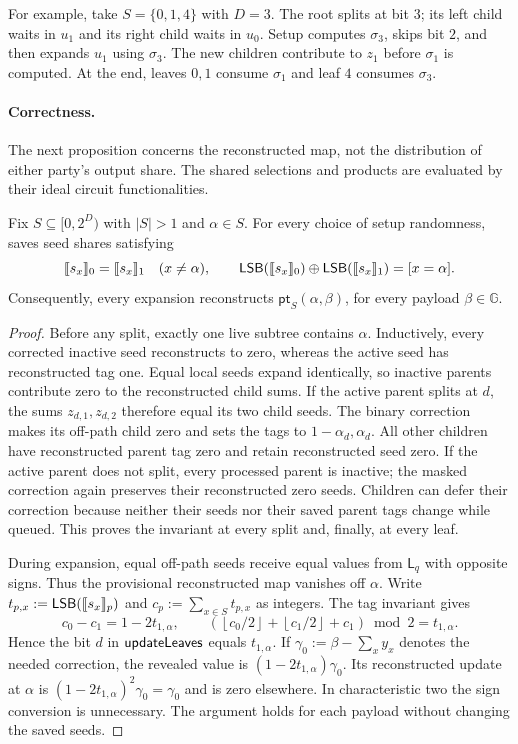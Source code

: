 For example, take $S=\{0,1,4\}$ with $D=3$.
The root splits at bit $3$; its left child waits in $u_1$ and its right child
waits in $u_0$. Setup computes $\sigma_3$, skips bit $2$, and then expands
$u_1$ using $\sigma_3$. The new children contribute to $z_1$ before
$\sigma_1$ is computed. At the end, leaves $0,1$ consume $\sigma_1$ and leaf
$4$ consumes $\sigma_3$.

\paragraph{Correctness.}
The next proposition concerns the reconstructed map, not the distribution
of either party's output share. The shared selections and products are
evaluated by their ideal circuit functionalities.

\begin{proposition}\label{prop:sparse-leaf-invariant}
Fix $S\subseteq[0,2^D)$ with $|S|>1$ and $\alpha\in S$.
For every choice of setup randomness,  saves seed
shares satisfying
\[
 \share{s_x}_0=\share{s_x}_1\quad(x\neq\alpha),
 \qquad
 \lsb(\share{s_x}_0)\oplus\lsb(\share{s_x}_1)=[x=\alpha].
\]
Consequently, every expansion reconstructs
$\mathsf{pt}_S(\alpha,\beta)$, for every payload $\beta\in\mathbb G$.
\end{proposition}
\begin{proof}
Before any split, exactly one live subtree contains $\alpha$.
Inductively, every corrected inactive seed reconstructs to zero, whereas the
active seed has reconstructed tag one. Equal local seeds expand identically,
so inactive parents contribute zero to the reconstructed child sums.
If the active parent splits at $d$, the sums $z_{d,1},z_{d,2}$ therefore
equal its two child seeds.
The binary correction makes its off-path child zero and sets the tags
to $1-\alpha_d,\alpha_d$. All other children have reconstructed parent tag
zero and retain reconstructed seed zero.
If the active parent does not split, every processed parent is inactive;
the masked correction again preserves their reconstructed zero seeds.
Children can defer their correction because neither their seeds nor their
saved parent tags change while queued. This proves the invariant at every
split and, finally, at every leaf.

During expansion, equal off-path seeds receive equal values from
$\mathsf L_q$ with opposite signs. Thus the provisional reconstructed map
vanishes off $\alpha$. Write $t_{p,x}:=\lsb(\share{s_x}_p)$ and
$c_p:=\sum_{x\in S}t_{p,x}$ as integers.
The tag invariant gives
\[
 c_0-c_1=1-2t_{1,\alpha},
 \qquad
 \left(\left\lfloor c_0/2\right\rfloor+
       \left\lfloor c_1/2\right\rfloor+c_1\right)\bmod2
       =t_{1,\alpha}.
\]
Hence the bit $d$ in $\textsf{updateLeaves}$ equals $t_{1,\alpha}$.
If $\gamma_0:=\beta-\sum_x y_x$ denotes the needed correction,
the revealed value is $(1-2t_{1,\alpha})\gamma_0$.
Its reconstructed update at $\alpha$ is
$(1-2t_{1,\alpha})^2\gamma_0=\gamma_0$ and is zero elsewhere.
In characteristic two the sign conversion is unnecessary.
The argument holds for each payload without changing the saved seeds.
\end{proof}

